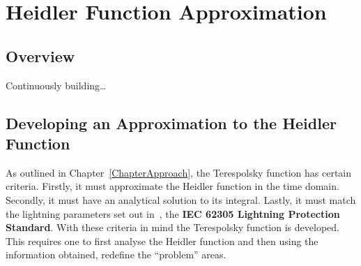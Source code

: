 
\chapter{Heidler Function Approximation} %

\label{ChapterApprox} %

\begin{quote}
\end{quote}


\section{Overview}
\label{sec:overview}

Continuously building\ldots

\section{Developing an Approximation to the Heidler Function}
\label{sec:developing_approximation}

As outlined in Chapter~\ref{ChapterApproach}, the Terespolsky function has certain criteria. Firstly, it must approximate the Heidler function in the time domain. Secondly, it must have an analytical solution to its integral. Lastly, it must match the lightning parameters set out in~\cite{IEC623051}, the \textbf{IEC 62305 Lightning Protection Standard}. With these criteria in mind the Terespolsky function is developed. This requires one to first analyse the Heidler function and then using the information obtained, redefine the ``problem'' areas.

